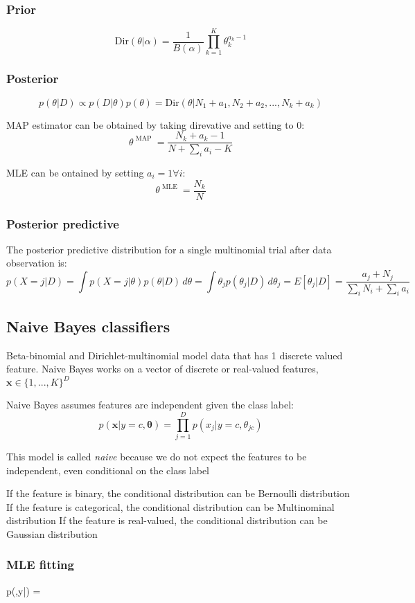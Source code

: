 \documentclass[11pt]{article}
\begin{document}
\subsubsection{Prior}
\[
\mathrm{Dir}(\theta|\alpha) = \frac{1}{B(\alpha)}\prod_{k=1}^K\theta_k^{a_k-1}
\]

\subsubsection{Posterior}
\[
p(\theta|D) \propto p(D|\theta)p(\theta) = \mathrm{Dir}(\theta|N_1+a_1,N_2+a_2,...,N_k+a_k)
\]

MAP estimator can be obtained by taking direvative and setting to 0:
\[
\theta^{\mbox{ MAP }} = \frac{N_k+a_k-1}{N+\sum_i a_i - K}
\]

MLE can be ontained by setting $a_i=1 \forall i$:
\[
\theta^{\mbox{ MLE }} = \frac{N_k}{N}
\]

\subsubsection{Posterior predictive}
The posterior predictive distribution for a single multinomial trial after data observation is:
\[
p(X=j|D)=\int p(X=j|\theta)p(\theta|D)\, d\theta=\int \theta_j p(\theta_j|D)\,d\theta_j=E[\theta_j|D]=\frac{a_j+N_j}{\sum_i N_i + \sum_i a_i}
\]

\subsection{Naive Bayes classifiers}
Beta-binomial and Dirichlet-multinomial model data that has 1 discrete valued feature. Naive Bayes works on a vector of discrete or real-valued features, $\mathbf{x} \in \{1,...,K\}^D$

Naive Bayes assumes features are independent given the class label:
\[
p(\mathbf{x}|y=c,\mathbf{\theta}) = \prod_{j=1}^D p(x_j|y=c,\theta_{jc})
\]

This model is called \emph{naive} because we do not expect the features to be independent, even conditional on the class label

If the feature is binary, the conditional distribution can be Bernoulli distribution
If the feature is categorical, the conditional distribution can be Multinominal distribution
If the feature is real-valued, the conditional distribution can be Gaussian distribution

\subsubsection{MLE fitting}
p(,y|\mathbf{\theta}) = 
\end{document}
